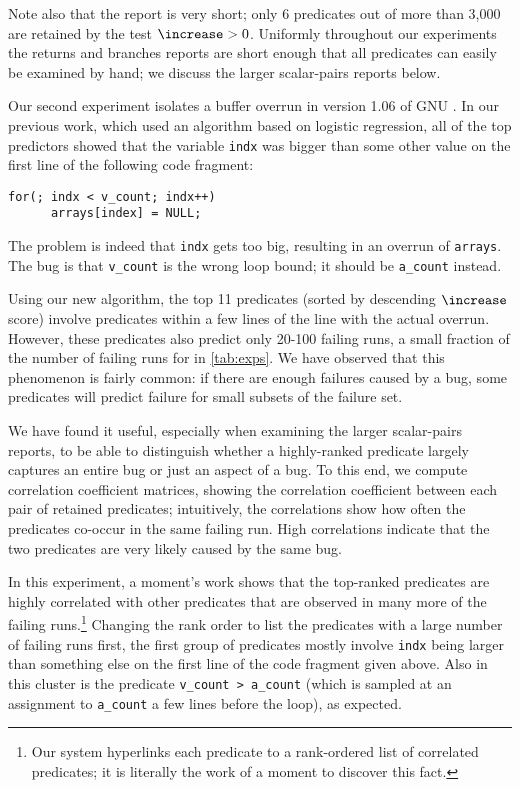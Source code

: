 Note also that the report is very short; only 6 predicates out of more than 3,000 are retained by the test $\increase > 0$.
Uniformly throughout our experiments the returns and branches reports are short enough that all predicates can
easily be examined by hand; we discuss the larger scalar-pairs reports below.

Our second experiment isolates a buffer overrun in version 1.06 of GNU \bc.  In our
previous work, which used an algorithm based on logistic regression, all of the top
predictors showed that the variable {\tt indx} was bigger than some other value on the first line of the following
code fragment:
\begin{verbatim}
for(; indx < v_count; indx++)
      arrays[index] = NULL;
\end{verbatim}
The problem is indeed that {\tt indx} gets too big, resulting in an overrun of {\tt arrays}.  The bug
is that {\tt v\_count} is the wrong loop bound; it should be {\tt a\_count} instead.  

Using our new algorithm, the top 11 predicates (sorted by descending
$\increase$ score) involve predicates within a few lines of the line
with the actual overrun.  However, these predicates also predict only
20-100 failing runs, a small fraction of the number of failing runs
for \bc in \autoref{tab:exps}.  We have observed that this
phenomenon is fairly common: if there are enough failures caused by a
bug, some predicates will predict failure for small subsets of the failure set.

We have found it useful, especially when examining the larger
scalar-pairs reports, to be able to distinguish whether a
highly-ranked predicate largely captures an entire bug or just an aspect of a bug.  To
this end, we compute correlation coefficient matrices, showing the correlation coefficient between each pair of retained predicates; 
intuitively, the
correlations show how often the predicates co-occur in the same failing run.  High correlations
indicate that the two predicates are very likely caused by the same bug.

In this experiment, a moment's work shows that the top-ranked predicates are highly
correlated with other predicates that are observed in many more of the
failing runs.\footnote{Our system hyperlinks each predicate to a
rank-ordered list of correlated predicates; it is literally the work
of a moment to discover this fact.}  Changing the rank order to list
the predicates with a large number of failing runs first, the first
group of predicates mostly involve {\tt indx} being larger than
something else on the first line of the code fragment given above.
Also in this cluster is the predicate {\tt v\_count > a\_count} (which is sampled at an assignment
to {\tt a\_count} a few lines before the loop), as
expected.

